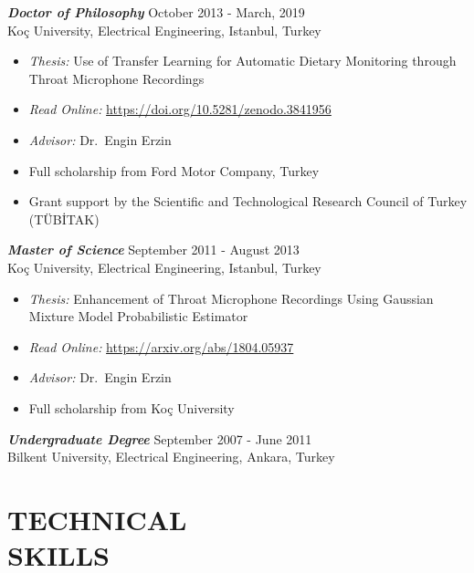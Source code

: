 \documentclass[margin, 10pt]{res} %
\begin{document}
\begin{resume}
{\sl \textbf{Doctor of Philosophy}} \hfill October 2013 - March, 2019 \\[.3em]
Ko\c{c} University, Electrical Engineering, Istanbul, Turkey \vspace{.3em}
\begin{itemize}
\item \textit{Thesis:} Use of Transfer Learning for Automatic Dietary Monitoring through Throat Microphone Recordings
\item \textit{Read Online:} \url{https://doi.org/10.5281/zenodo.3841956}
\item \textit{Advisor:} Dr.~Engin Erzin
\item Full scholarship from Ford Motor Company, Turkey
\item Grant support by the Scientific and Technological Research Council of Turkey (T\"{U}B{\.I}TAK)
\end{itemize}

{\sl \textbf{Master of Science}} \hfill September 2011 - August 2013 \\[.3em]
Ko\c{c} University, Electrical Engineering, Istanbul, Turkey \vspace{.3em}
\begin{itemize}
\item \textit{Thesis:} Enhancement of Throat Microphone Recordings Using Gaussian \\ Mixture Model Probabilistic Estimator
\item \textit{Read Online:} \url{https://arxiv.org/abs/1804.05937}
\item \textit{Advisor:} Dr.~Engin Erzin
\item Full scholarship from Ko\c{c} University
\end{itemize}

{\sl \textbf{Undergraduate Degree}} \hfill September 2007 - June 2011 \\[.3em]
Bilkent University, Electrical Engineering, Ankara, Turkey \vspace{.3em}
\begin{itemize}
\end{itemize}

\vspace{1em}
\section{TECHNICAL \\ SKILLS}


\end{resume}
\end{document}
